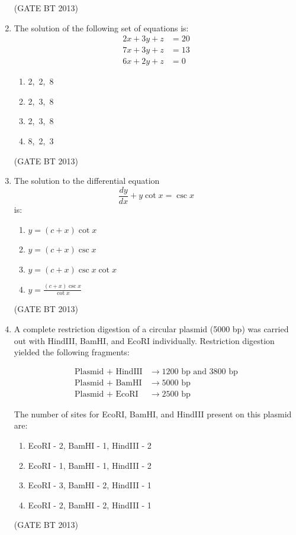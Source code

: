 \documentclass[journal,12pt,onecolumn]{IEEEtran}
\theoremstyle{remark}
\begin{document}
\begin{enumerate}
\begin{enumerate}
\end{enumerate} \hfill(GATE BT 2013)

\item 

The solution of the following set of equations is:
\[
\begin{aligned}
2x + 3y + z &= 20 \\
7x + 3y + z &= 13 \\
6x + 2y + z &= 0
\end{aligned}
\]

\begin{enumerate}
    \item 2,\ 2,\ 8
    \item 2,\ 3,\ 8
    \item 2,\ 3,\ 8
    \item 8,\ 2,\ 3
\end{enumerate} \hfill(GATE BT 2013)

\item 

The solution to the differential equation 
\[
\frac{dy}{dx} + y \cot x = \csc x
\]
is:

\begin{enumerate}
    \item \( y = (c + x) \cot x \)
    \item \( y = (c + x) \csc x \)
    \item \( y = (c + x) \csc x \cot x \)
    \item \( y = \frac{(c + x) \csc x}{\cot x} \)
\end{enumerate} \hfill(GATE BT 2013)

\item 

A complete restriction digestion of a circular plasmid (5000 bp) was carried out with HindIII, BamHI, and EcoRI individually. Restriction digestion yielded the following fragments:

\[
\begin{aligned}
\text{Plasmid + HindIII} &\to 1200 \text{ bp and } 3800 \text{ bp} \\
\text{Plasmid + BamHI} &\to 5000 \text{ bp} \\
\text{Plasmid + EcoRI} &\to 2500 \text{ bp}
\end{aligned}
\]

The number of sites for EcoRI, BamHI, and HindIII present on this plasmid are:

\begin{enumerate}
    \item EcoRI - 2, BamHI - 1, HindIII - 2
    \item EcoRI - 1, BamHI - 1, HindIII - 2
    \item EcoRI - 3, BamHI - 2, HindIII - 1
    \item EcoRI - 2, BamHI - 2, HindIII - 1
\end{enumerate} \hfill(GATE BT 2013)


\end{enumerate}
\end{document}
